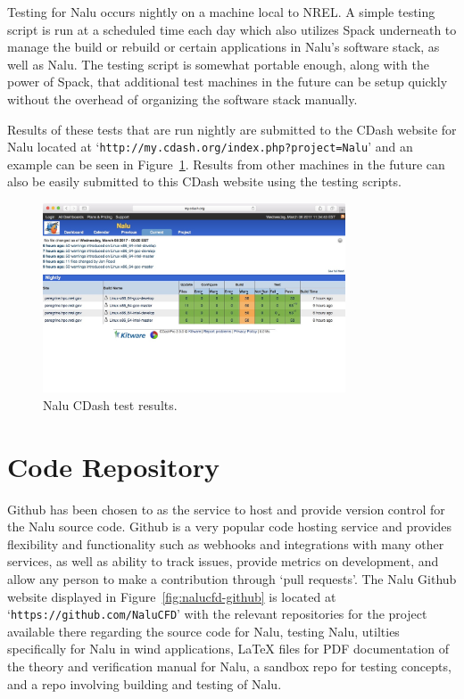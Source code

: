 \documentclass[12pt, oneside]{article}
\begin{document}
Testing for Nalu occurs nightly on a machine local to NREL. A simple testing script is run at a scheduled time each day which also utilizes Spack underneath to manage the build or rebuild or certain applications in Nalu's software stack, as well as Nalu. The testing script is somewhat portable enough, along with the power of Spack, that additional test machines in the future can be setup quickly without the overhead of organizing the software stack manually.

Results of these tests that are run nightly are submitted to the CDash website for Nalu located at `\texttt{http://my.cdash.org/index.php?project=Nalu}' and an example can be seen in Figure~\ref{fig:nalu-cdash}. Results from other machines in the future can also be easily submitted to this CDash website using the testing scripts.

\begin{figure}
  \centering
    \includegraphics[width=0.8\textwidth]{nalu-cdash}
  \caption{Nalu CDash test results.}
  \label{fig:nalu-cdash}
\end{figure}

\section{Code Repository}

Github has been chosen to as the service to host and provide version control for the Nalu source code. Github is a very popular code hosting service and provides flexibility and functionality such as webhooks and integrations with many other services, as well as ability to track issues, provide metrics on development, and allow any person to make a contribution through `pull requests'. The Nalu Github website displayed in Figure~\ref{fig:nalucfd-github} is located at `\texttt{https://github.com/NaluCFD}' with the relevant repositories for the project available there regarding the source code for Nalu, testing Nalu, utilties specifically for Nalu in wind applications, LaTeX files for PDF documentation of the theory and verification manual for Nalu, a sandbox repo for testing concepts, and a repo involving building and testing of Nalu.
\end{document}
